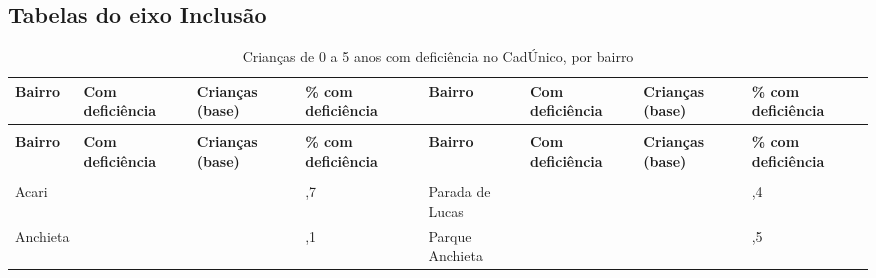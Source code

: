 \begin{apendicesenv}
\chapter{Tabelas do eixo Inclusão}\label{ap:eixo-2}

{\renewcommand{\arraystretch}{1.0}
{\footnotesize\setlength{\tabcolsep}{3.5pt}
\begin{longtable}{@{}>{\raggedright\arraybackslash}p{2.95cm}>{\raggedleft\arraybackslash}p{1.25cm}>{\raggedleft\arraybackslash}p{1.25cm}>{\raggedleft\arraybackslash}p{1.25cm}@{\hspace{0.6cm}}>{\raggedright\arraybackslash}p{2.95cm}>{\raggedleft\arraybackslash}p{1.25cm}>{\raggedleft\arraybackslash}p{1.25cm}>{\raggedleft\arraybackslash}p{1.25cm}@{}}
\caption{Crianças de 0 a 5 anos com deficiência no CadÚnico, por bairro}\label{tab:tabela-mapa-cadunico-deficiencia-bairro-2026}\\
\toprule \hyphenpenalty=10000\exhyphenpenalty=10000\textbf{Bairro} & \hyphenpenalty=10000\exhyphenpenalty=10000\textbf{Com deficiência} & \hyphenpenalty=10000\exhyphenpenalty=10000\textbf{Crianças (base)} & \hyphenpenalty=10000\exhyphenpenalty=10000\textbf{\% com deficiência} & \hyphenpenalty=10000\exhyphenpenalty=10000\textbf{Bairro} & \hyphenpenalty=10000\exhyphenpenalty=10000\textbf{Com deficiência} & \hyphenpenalty=10000\exhyphenpenalty=10000\textbf{Crianças (base)} & \hyphenpenalty=10000\exhyphenpenalty=10000\textbf{\% com deficiência} \\ \midrule \endfirsthead
\multicolumn{8}{@{}l}{\footnotesize\itshape (continuação)}\\ \toprule \hyphenpenalty=10000\exhyphenpenalty=10000\textbf{Bairro} & \hyphenpenalty=10000\exhyphenpenalty=10000\textbf{Com deficiência} & \hyphenpenalty=10000\exhyphenpenalty=10000\textbf{Crianças (base)} & \hyphenpenalty=10000\exhyphenpenalty=10000\textbf{\% com deficiência} & \hyphenpenalty=10000\exhyphenpenalty=10000\textbf{Bairro} & \hyphenpenalty=10000\exhyphenpenalty=10000\textbf{Com deficiência} & \hyphenpenalty=10000\exhyphenpenalty=10000\textbf{Crianças (base)} & \hyphenpenalty=10000\exhyphenpenalty=10000\textbf{\% com deficiência} \\ \midrule \endhead
\midrule \multicolumn{8}{r@{}}{\footnotesize\itshape (continua)}\\ \endfoot
\bottomrule \endlastfoot
Acari & 45 & 1.646 & 2,7 & Parada de Lucas & 27 & 618 & 4,4 \\
Anchieta & 97 & 2.395 & 4,1 & Parque Anchieta & 21 & 467 & 4,5 \\

\end{longtable}}}
\end{apendicesenv}
